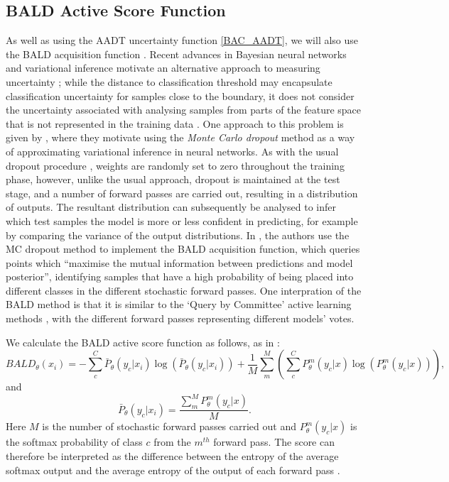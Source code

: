 \subsection{BALD Active Score Function}
As well as using the AADT uncertainty function \ref{BAC_AADT}, we will also use the BALD acquisition function\cite{houlsby2011bayesian} \cite{gal2017deep}. Recent advances in Bayesian neural networks and variational inference motivate an alternative approach to measuring uncertainty \cite{gal2016uncertainty}; while the distance to classification threshold may encapsulate classification uncertainty for samples close to the boundary, it does not consider the uncertainty associated with analysing samples from parts of the feature space that is not represented in the training data \cite{gal2016uncertainty}. One approach to this problem is given by \cite{gal2016dropout}, where they motivate using the \textit{Monte Carlo dropout} method as a way of approximating variational inference in neural networks. As with the usual dropout procedure \cite{srivastava2014dropout}, weights are randomly set to zero throughout the training phase, however, unlike the usual approach, dropout is maintained at the test stage, and a number of forward passes are carried out, resulting in a distribution of outputs. The resultant distribution can subsequently be analysed to infer which test samples the model is more or less confident in predicting, for example by comparing the variance of the output distributions. In \cite{gal2017deep}, the authors use the MC dropout method to implement the BALD acquisition function, which queries points which ``maximise the mutual information between predictions and model posterior'', identifying samples that have a high probability of being placed into different classes in the different stochastic forward passes. One interpration of the BALD method is that it is similar to the `Query by Committee' active learning methods \cite{settles2012active}, with the different forward passes representing different models' votes. 

We calculate the BALD active score function as follows, as in \cite{gal2017deep}:
\begin{equation}
BALD_{\theta}(x_i) = - \sum_{c}^{C} \bar{P}_{\theta}(y_c|x_i)\log( \bar{P}_{\theta}(y_c|x_i)) + \frac{1}{M} \sum_{m}^{M} (\sum_{c}^{C} P^{m}_{\theta}(y_c|x)\log(P^{m}_{\theta}(y_c|x))),
\end{equation}
and
\begin{equation}
 \bar{P}_{\theta}(y_c|x_i) = \frac{\sum_{m}^{M}P^{m}_{\theta}(y_c|x)}{M}. 
\end{equation}
Here $M$ is the number of stochastic forward passes carried out and $P^{m}_{\theta}(y_c|x)$ is the softmax probability of class $c$ from the $m^{th}$ forward pass. The score can therefore be interpreted as the difference between the entropy of the average softmax output and the average entropy of the output of each forward pass \cite{gal2017deep}.
 
